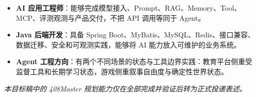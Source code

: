\begin{itemize}[parsep=0.65ex]
  \item \textbf{AI 应用工程师}：能够完成模型接入、Prompt、RAG、Memory、Tool、MCP、评测观测与产品交付，不把 API 调用等同于 Agent。
  \item \textbf{Java 后端开发}：具备 Spring Boot、MyBatis、MySQL、Redis、接口兼容、数据迁移、安全和可观测实践，能够将 AI 能力放入可维护的业务系统。
  \item \textbf{Agent 工程方向}：有两个不同场景的状态与工具边界实践：教育平台侧重受监督工具和长期学习状态，游戏侧重叙事自由度与确定性世界状态。
\end{itemize}

\vfill
\begin{center}
\textit{本目标稿中的 408Master 规划能力仅在全部完成并验证后转为正式投递表述。}
\end{center}
